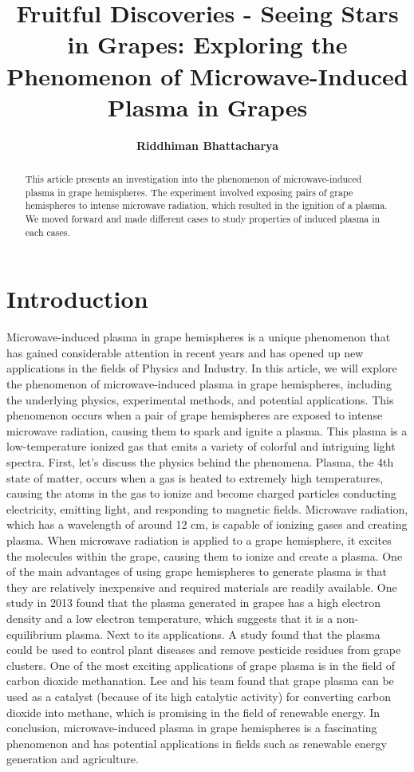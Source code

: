 \documentclass{article}
\title{\textbf {Fruitful Discoveries - Seeing Stars in Grapes: Exploring the Phenomenon of Microwave-Induced Plasma in Grapes}}
\author{\textbf{Riddhiman Bhattacharya }}
\begin{document}
\maketitle

\begin{abstract}
\Large
This article presents an investigation into the phenomenon of microwave-induced plasma in grape hemispheres. The experiment involved exposing pairs of grape hemispheres to intense microwave radiation, which resulted in the ignition of a plasma. We moved forward and made different cases to study properties of induced plasma in each cases.

\end{abstract}

\section{Introduction}
\large
Microwave-induced plasma in grape hemispheres is a unique phenomenon that has gained considerable attention in recent years and has opened up new applications in the fields of Physics and Industry. In this article, we will explore the phenomenon of microwave-induced plasma in grape hemispheres, including the underlying physics, experimental methods, and potential applications.
This phenomenon occurs when a pair of grape hemispheres are exposed to intense microwave radiation, causing them to spark and ignite a plasma. This plasma is a low-temperature ionized gas that emits a variety of colorful and intriguing light spectra.
First, let's discuss the physics behind the phenomena. Plasma, the 4th state of matter, occurs when a gas is heated to extremely high temperatures, causing the atoms in the gas to ionize and become charged particles conducting electricity, emitting light, and responding to magnetic fields. Microwave radiation, which has a wavelength of around 12 cm, is capable of ionizing gases and creating plasma. When microwave radiation is applied to a grape hemisphere, it excites the molecules within the grape, causing them to ionize and create a plasma.
One of the main advantages of using grape hemispheres to generate plasma is that they are relatively inexpensive and required materials are readily available.
One study in 2013 found that the plasma generated in grapes has a high electron density and a low electron temperature, which suggests that it is a non-equilibrium plasma. 
Next to its applications. 
A study found that the plasma could be used to control plant diseases and remove pesticide residues from grape clusters.
One of the most exciting applications of grape plasma is in the field of carbon dioxide methanation. Lee and his team found that grape plasma can be used as a catalyst (because of its high catalytic activity) for converting carbon dioxide into methane, which is promising in the field of renewable energy. 
In conclusion, microwave-induced plasma in grape hemispheres is a fascinating phenomenon and has potential applications in fields such as renewable energy generation and agriculture. 
\end{document}
